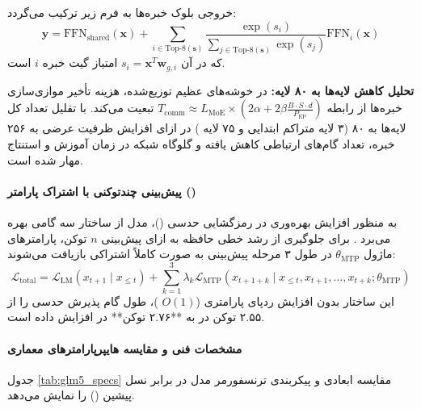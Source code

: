 خروجی بلوک خبره‌ها به فرم زیر ترکیب می‌گردد:
\begin{equation}
    \mathbf{y} = \text{FFN}_{\text{shared}}(\mathbf{x}) + \sum_{i \in \text{Top-}8(\mathbf{s})} \frac{\exp(s_i)}{\sum_{j \in \text{Top-}8(\mathbf{s})} \exp(s_j)} \text{FFN}_i(\mathbf{x})
\end{equation}
که در آن $s_i = \mathbf{x}^T \mathbf{w}_{g, i}$ امتیاز گیت خبره $i$ است. 

\textbf{تحلیل کاهش لایه‌ها به ۸۰ لایه:}
در خوشه‌های عظیم توزیع‌شده، هزینه تأخیر موازی‌سازی خبره‌ها از رابطه $T_{\text{comm}} \approx L_{\text{MoE}} \times (2\alpha + 2\beta \frac{B \cdot S \cdot d}{P_{\text{EP}}})$ تبعیت می‌کند. با تقلیل تعداد کل لایه‌ها به ۸۰ (۳ لایه متراکم ابتدایی و ۷۵ لایه ) در ازای افزایش ظرفیت عرضی به ۲۵۶ خبره، تعداد گام‌های ارتباطی  کاهش یافته و گلوگاه شبکه در زمان آموزش و استنتاج مهار شده است.

\paragraph*{پیش‌بینی چندتوکنی با اشتراک پارامتر ()}
به منظور افزایش بهره‌وری در رمزگشایی حدسی ()، مدل از ساختار  سه گامی بهره می‌برد \cite{gloeckle2024better, deepseek2025v32}. برای جلوگیری از رشد خطی حافظه به ازای پیش‌بینی $n$ توکن، پارامترهای ماژول $\theta_{\text{MTP}}$ در طول ۳ مرحله پیش‌بینی به صورت کاملاً اشتراکی بازیافت می‌شوند:
\begin{equation}
    \mathcal{L}_{\text{total}} = \mathcal{L}_{\text{LM}}(x_{t+1} \mid x_{\le t}) + \sum_{k=1}^3 \lambda_k \mathcal{L}_{\text{MTP}}\left(x_{t+1+k} \mid x_{\le t}, x_{t+1}, \dots, x_{t+k}; \theta_{\text{MTP}}\right)
\end{equation}
این ساختار بدون افزایش ردپای پارامتری ($O(1)$ )، طول گام پذیرش حدسی را از ۲.۵۵ توکن در  به **۲.۷۶ توکن** در  افزایش داده است.

\paragraph*{مشخصات فنی و مقایسه هایپرپارامترهای معماری}
جدول \ref{tab:glm5_specs} مقایسه ابعادی و پیکربندی ترنسفورمر مدل  در برابر نسل پیشین () را نمایش می‌دهد.

